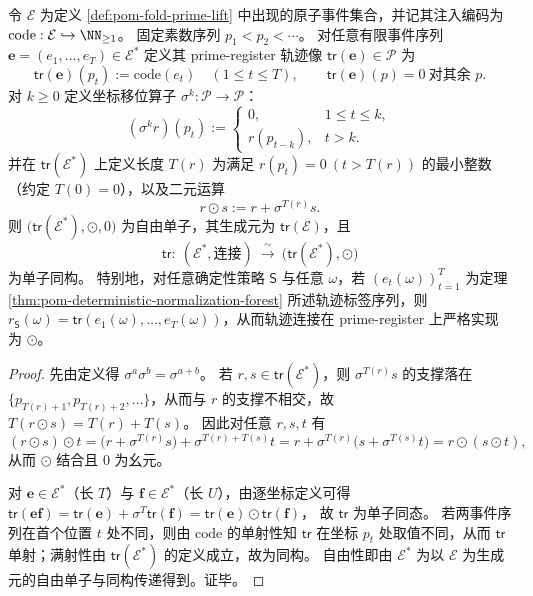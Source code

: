 \begin{theorem}\label{thm:pom-prime-trace-shift-free-monoid}
令 \(\mathcal E\) 为定义 \ref{def:pom-fold-prime-lift} 中出现的原子事件集合，并记其注入编码为 \(\mathrm{code}:\mathcal E\hookrightarrow\NN_{\ge 1}\)。
固定素数序列 \(p_1<p_2<\cdots\)。
对任意有限事件序列 \(\mathbf e=(e_1,\dots,e_T)\in\mathcal E^*\) 定义其 prime-register 轨迹像 \(\mathsf{tr}(\mathbf e)\in\mathcal P\) 为
\[
\mathsf{tr}(\mathbf e)(p_t):=\mathrm{code}(e_t)\quad(1\le t\le T),
\qquad
\mathsf{tr}(\mathbf e)(p)=0\ \text{对其余 }p.
\]
对 \(k\ge 0\) 定义坐标移位算子 \(\sigma^k:\mathcal P\to\mathcal P\)：
\[
(\sigma^k r)(p_t):=
\begin{cases}
0,&1\le t\le k,\\
r(p_{t-k}),&t>k.
\end{cases}
\]
并在 \(\mathsf{tr}(\mathcal E^*)\) 上定义长度 \(T(r)\) 为满足 \(r(p_t)=0\ (t>T(r))\) 的最小整数（约定 \(T(0)=0\)），以及二元运算
\[
r\odot s:=r+\sigma^{T(r)}s.
\]
则 \(\bigl(\mathsf{tr}(\mathcal E^*),\odot,0\bigr)\) 为自由单子，其生成元为 \(\mathsf{tr}(\mathcal E)\)，且
\[
\mathsf{tr}:\ (\mathcal E^*,\text{连接})\ \xrightarrow{\ \sim\ }\ \bigl(\mathsf{tr}(\mathcal E^*),\odot\bigr)
\]
为单子同构。
特别地，对任意确定性策略 \(\mathsf S\) 与任意 \(\omega\)，若 \((e_t(\omega))_{t=1}^{T}\) 为定理 \ref{thm:pom-deterministic-normalization-forest} 所述轨迹标签序列，则 \(r_{\mathsf S}(\omega)=\mathsf{tr}(e_1(\omega),\dots,e_T(\omega))\)，从而轨迹连接在 prime-register 上严格实现为 \(\odot\)。
\end{theorem}
\begin{proof}
先由定义得 \(\sigma^a\sigma^b=\sigma^{a+b}\)。
若 \(r,s\in\mathsf{tr}(\mathcal E^*)\)，则 \(\sigma^{T(r)}s\) 的支撑落在 \(\{p_{T(r)+1},p_{T(r)+2},\dots\}\)，从而与 \(r\) 的支撑不相交，故
\(
T(r\odot s)=T(r)+T(s)
\)。
因此对任意 \(r,s,t\) 有
\[
(r\odot s)\odot t
=\bigl(r+\sigma^{T(r)}s\bigr)+\sigma^{T(r)+T(s)}t
=r+\sigma^{T(r)}\bigl(s+\sigma^{T(s)}t\bigr)
=r\odot(s\odot t),
\]
从而 \(\odot\) 结合且 \(0\) 为幺元。
\par
对 \(\mathbf e\in\mathcal E^*\)（长 \(T\)）与 \(\mathbf f\in\mathcal E^*\)（长 \(U\)），由逐坐标定义可得
\(
\mathsf{tr}(\mathbf e\mathbf f)=\mathsf{tr}(\mathbf e)+\sigma^{T}\mathsf{tr}(\mathbf f)
=\mathsf{tr}(\mathbf e)\odot \mathsf{tr}(\mathbf f)
\)，
故 \(\mathsf{tr}\) 为单子同态。
若两事件序列在首个位置 \(t\) 处不同，则由 \(\mathrm{code}\) 的单射性知 \(\mathsf{tr}\) 在坐标 \(p_t\) 处取值不同，从而 \(\mathsf{tr}\) 单射；满射性由 \(\mathsf{tr}(\mathcal E^*)\) 的定义成立，故为同构。
自由性即由 \(\mathcal E^*\) 为以 \(\mathcal E\) 为生成元的自由单子与同构传递得到。证毕。
\end{proof}

